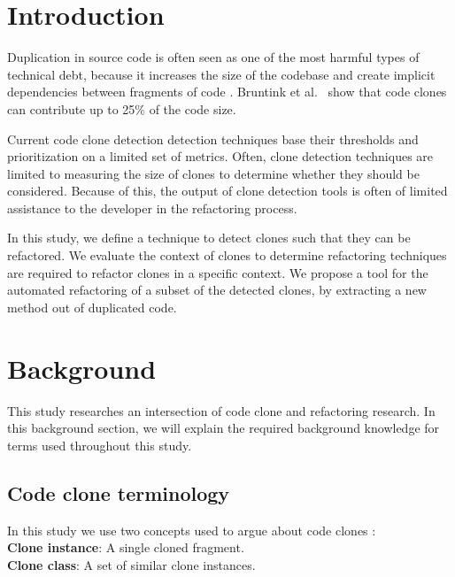 \documentclass[sigconf,review]{acmart}
\begin{document}
\section{Introduction}
Duplication in source code is often seen as one of the most harmful types of technical debt, because it increases the size of the codebase and create implicit dependencies between fragments of code \cite{ostberg2014automatically}. Bruntink et al.~\cite{bruntink2005use} show that code clones can contribute up to 25\% of the code size.

Current code clone detection detection techniques base their thresholds and prioritization on a limited set of metrics. Often, clone detection techniques are limited to measuring the size of clones to determine whether they should be considered. Because of this, the output of clone detection tools is often of limited assistance to the developer in the refactoring process.

In this study, we define a technique to detect clones such that they can be refactored. We evaluate the context of clones to determine refactoring techniques are required to refactor clones in a specific context. We propose a tool for the automated refactoring of a subset of the detected clones, by extracting a new method out of duplicated code.

\section{Background}
This study researches an intersection of code clone and refactoring research. In this background section, we will explain the required background knowledge for terms used throughout this study.

\subsection{Code clone terminology}
In this study we use two concepts used to argue about code clones \cite{roy2007survey}:
\\ \textbf{Clone instance}: A single cloned fragment.
\\ \textbf{Clone class}: A set of similar clone instances.

\end{document}
